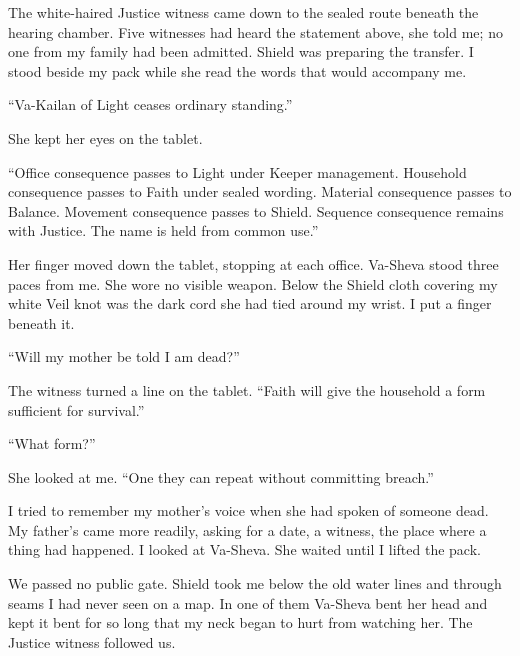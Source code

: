 
\ornament

The white-haired Justice witness came down to the sealed route beneath the hearing chamber. Five witnesses had heard the statement above, she told me; no one from my family had been admitted. Shield was preparing the transfer. I stood beside my pack while she read the words that would accompany me.\par

``Va-Kailan of Light ceases ordinary standing.''\par

She kept her eyes on the tablet.\par

``Office consequence passes to Light under Keeper management. Household consequence passes to Faith under sealed wording. Material consequence passes to Balance. Movement consequence passes to Shield. Sequence consequence remains with Justice. The name is held from common use.''\par

Her finger moved down the tablet, stopping at each office. Va-Sheva stood three paces from me. She wore no visible weapon. Below the Shield cloth covering my white Veil knot was the dark cord she had tied around my wrist. I put a finger beneath it.\par

``Will my mother be told I am dead?''\par

The witness turned a line on the tablet. ``Faith will give the household a form sufficient for survival.''\par

``What form?''\par

She looked at me. ``One they can repeat without committing breach.''\par

I tried to remember my mother's voice when she had spoken of someone dead. My father's came more readily, asking for a date, a witness, the place where a thing had happened. I looked at Va-Sheva. She waited until I lifted the pack.\par

We passed no public gate. Shield took me below the old water lines and through seams I had never seen on a map. In one of them Va-Sheva bent her head and kept it bent for so long that my neck began to hurt from watching her. The Justice witness followed us.\par

